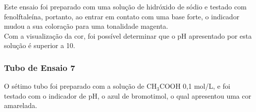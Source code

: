    	\indent Este ensaio foi preparado com uma solução de hidróxido de sódio e testado com fenolftaleína, portanto, ao entrar em contato com uma base forte, o indicador mudou a sua coloração para uma tonalidade magenta.\\
    	
    	\indent Com a visualização da cor, foi possível determinar que o pH apresentado por esta solução é superior a 10.

	\newpage
	\subsubsection{Tubo de Ensaio 7}

        \indent O sétimo tubo foi preparado com a solução de CH$_3$COOH 0,1 mol/L, e foi testado com o indicador de pH, o azul de bromotimol, o qual apresentou uma cor amarelada.

